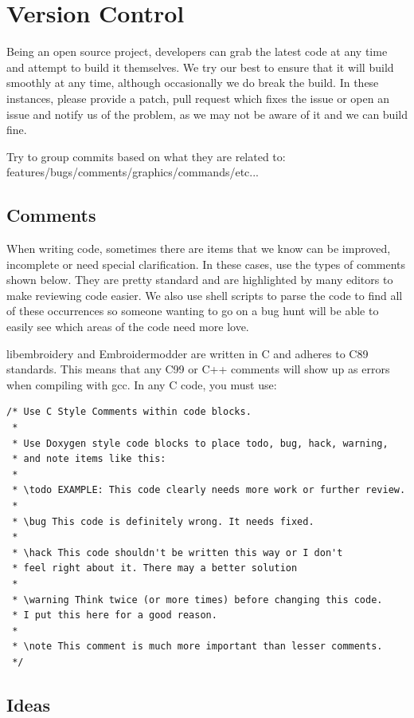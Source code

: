 \documentclass[10pt]{report}
\newcommand{\todo}[1]{\marginpar{\emph{TODO}\\{\footnotesize #1}}}
\begin{document}
\section{Version Control}

Being an open source project, developers can grab the latest code at any
time and attempt to build it themselves. We try our best to ensure that
it will build smoothly at any time, although occasionally we do break
the build. In these instances, please provide a patch, pull request
which fixes the issue or open an issue and notify us of the problem, as
we may not be aware of it and we can build fine.

Try to group commits based on what they are related to:
features/bugs/comments/graphics/commands/etc...

\subsection{Comments}

When writing code, sometimes there are items that we know can be
improved, incomplete or need special clarification. In these cases, use
the types of comments shown below. They are pretty standard and are
highlighted by many editors to make reviewing code easier. We also use
shell scripts to parse the code to find all of these occurrences so
someone wanting to go on a bug hunt will be able to easily see which
areas of the code need more love.

libembroidery and Embroidermodder are written in C and adheres to C89 standards. This means
that any C99 or C++ comments will show up as errors when compiling with
gcc. In any C code, you must use:

\begin{lstlisting}
/* Use C Style Comments within code blocks.
 *
 * Use Doxygen style code blocks to place todo, bug, hack, warning,
 * and note items like this:
 *
 * \todo EXAMPLE: This code clearly needs more work or further review.
 *
 * \bug This code is definitely wrong. It needs fixed.
 *
 * \hack This code shouldn't be written this way or I don't
 * feel right about it. There may a better solution
 *
 * \warning Think twice (or more times) before changing this code.
 * I put this here for a good reason.
 *
 * \note This comment is much more important than lesser comments.
 */
\end{lstlisting}

\subsection{Ideas}
\end{document}
